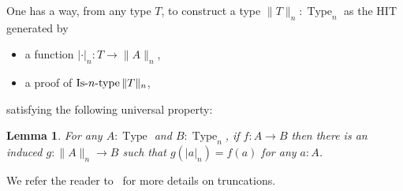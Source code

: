 \documentclass[preprint,9pt,numbers]{sigplanconf}
\newtheorem{lem}[thm]{Lemma}
\newcommand{\eg}{e.g,\xspace}
\DeclareMathOperator{\Type}{Type}
\DeclareMathOperator{\HProp}{HProp}
\def\mymathhyphen{{\hbox{-}}}
\newcommand{\IsType}[1]
{\mathop{\mathrm{Is\mymathhyphen}#1\mathrm{\mymathhyphen type}} }
\newcommand \squash[1] {\| #1 \| }
\begin{document}
One has a way, from any type $T$, to construct a type
$\|T\|_n:\Type_n$ as the HIT generated by
\begin{itemize}
\item a function $|\cdot|_n : T \to \|A\|_n$,
\item a proof of $\IsType n \|T\|_n$,
\end{itemize}
 satisfying the following universal property:


\begin{lem}
  For any $A:\Type$ and $B:\Type_n$, if $f:A \to B$ then there is an
  induced $g:\|A\|_n\to B$ such that $g(|a|_n)= f(a)$ for any $a:A$.
\end{lem}
%
We refer the reader to~\cite[7.3]{hottbook} for more details on 
truncations.
\end{document}
